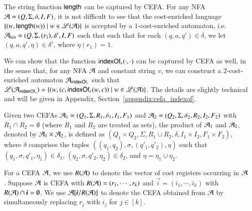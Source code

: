 \begin{example}\label{exm:len}
The string function $\mathsf{length}$ can be captured by CEFA. For any NFA $\mathcal{A}=(Q, \Sigma,  \delta, I, F)$, it is not difficult to see that the cost-enriched language $\{(w, \mathsf{length}(w)) \mid w\in \mathscr{L}(\mathcal{A})\}$ is accepted by a $1$-cost-enriched automaton, i.e.
$\mathcal{A}_{\rm len}=(Q, \Sigma, (r_1), \delta', I, F)$ such that %
such that for each $(q, a, q')\in \delta$, we let $(q, a, q', \eta)\in \delta'$, where $\eta(r_1) = 1$.
\end{example}

We can show that the function $\mathsf{indexOf}_v(\cdot, \cdot)$ can be captured by CEFA as well, in the sense that, for any NFA $\mathcal{A}$ and constant string $v$, we can construct a $2$-cost-enriched automaton $\mathcal{A}_{\mathsf{indexOf}_v}$ such that $\mathscr{L}(\mathcal{A}_{\mathsf{indexOf}_v})=\{(w, (c, \mathsf{indexOf}_v(w, c))\mid w\in \mathscr{L}(\mathcal{A}) \}$. The details are slightly technical and will be given in Appendix, Section~\ref{appendix:cefa_indexof}. 



Given two CEFAs $\mathcal{A}_1 = ( Q_1, \Sigma, R_1, \delta_1, I_1, F_1)$ and $\mathcal{A}_2 = (Q_2, \Sigma, \delta_2, R_2, I_2, F_2)$ with $R_1 \cap R_2 = \emptyset$ (where %
$R_1$ and $R_2$ are treated as sets), the product of $\mathcal{A}_1$ and $\mathcal{A}_2$, denoted by $\mathcal{A}_1 \times \mathcal{A}_2$, is defined as $(Q_1 \times Q_2, \Sigma, R_1 \cup R_2, \delta, I_1 \times I_2, F_1 \times F_2)$, where $\delta$ comprises the tuples $((q_1, q_2), \sigma, (q'_1, q'_2), \eta)$ such that $(q_1, \sigma, q'_1, \eta_1) \in \delta_1$, $(q_2, \sigma, q'_2, \eta_2) \in \delta_2$, and $\eta = \eta_1\cup \eta_2$.  %


For a CEFA $\mathcal{A}$, we use $R(\mathcal{A})$ to denote the vector of cost registers occurring in $\mathcal{A}$. %
Suppose $\mathcal{A}$ is  CEFA with $R(\mathcal{A})=(r_1,\cdots, r_k)$ and $\vec{i} = (i_1,\cdots, i_k)$ with $R(\NFA) \cap \vec{i} = \emptyset$. We use $\CEFA[\vec{i}/R(\CEFA)]$ to denote the CEFA obtained from $\mathcal{A}$ by simultaneously replacing $r_j$ with $i_j$ for $j \in [k]$. 

\smallskip



